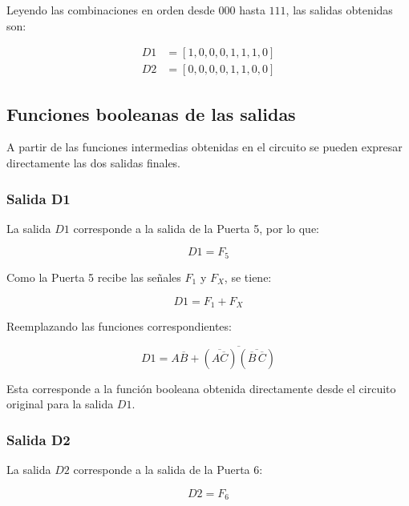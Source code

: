 \documentclass[12pt]{report}
\begin{document}
Leyendo las combinaciones en orden desde $000$ hasta $111$, las salidas obtenidas son:

\begin{align}
    D1 &= [1,0,0,0,1,1,1,0] \\
    D2 &= [0,0,0,0,1,1,0,0]
\end{align}


\subsection{Funciones booleanas de las salidas}

A partir de las funciones intermedias obtenidas en el circuito se pueden expresar
directamente las dos salidas finales.

\subsubsection{Salida D1}

La salida $D1$ corresponde a la salida de la Puerta 5, por lo que:

\begin{equation}
    D1 = F_5
\end{equation}

Como la Puerta 5 recibe las señales $F_1$ y $F_X$, se tiene:

\begin{equation}
    D1 = F_1 + F_X
\end{equation}

Reemplazando las funciones correspondientes:

\begin{equation}
    D1 =
    A\overline{B}
    +
    \overline{
        \left(\overline{A\overline{C}}\right)
        \left(\overline{\overline{B}\,\overline{C}}\right)
    }
\end{equation}

Esta corresponde a la función booleana obtenida directamente desde el circuito
original para la salida $D1$.


\subsubsection{Salida D2}

La salida $D2$ corresponde a la salida de la Puerta 6:

\begin{equation}
    D2 = F_6
\end{equation}
\end{document}
